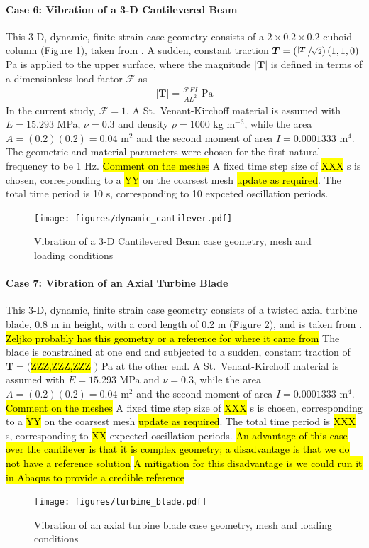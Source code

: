 \documentclass[sn-mathphys,Numbered,draft]{sn-jnl}%
\newcommand{\bb}{\boldsymbol}
\begin{document}
\paragraph{Case 6: Vibration of a 3-D Cantilevered Beam}
This 3-D, dynamic, finite strain case geometry consists of a $2 \times 0.2 \times 0.2$ cuboid column (Figure \ref{fig:dynamic_cantilever}), taken from \citet{Tukovic2007}.
A sudden, constant traction $\bb{T} = \left(\sfrac{|\bb{T}|}{\sqrt{2}}\right) \left(1, 1, 0 \right)$ Pa is applied to the upper surface, where the magnitude $|\bb{T}|$ is defined in terms of a dimensionless load factor $\mathcal{F}$ as
\begin{eqnarray}
	|\bb{T}| = \frac{\mathcal{F} E I}{A L^2} \text{ Pa}
\end{eqnarray}
In the current study, $\mathcal{F} = 1$.
A St.\ Venant-Kirchoff material is assumed with $E = 15.293$ MPa, $\nu = 0.3$ and density $\rho = 1000$ kg m$^{-3}$, while the area $A = (0.2)(0.2) = 0.04$ m$^2$ and the second moment of area $I = 0.0001333$ m$^4$.
The geometric and material parameters were chosen for the first natural frequency to be 1 Hz.
\hl{Comment on the meshes}
A fixed time step size of \hl{XXX} s is chosen, corresponding to a \hl{YY} on the coarsest mesh \hl{update as required}.
The total time period is 10 s, corresponding to 10 expceted oscillation periods.
\begin{figure}[htbp]
   \centering
   \texttt{[image: figures/dynamic\_cantilever.pdf]} 
   \caption{Vibration of a 3-D Cantilevered Beam case geometry, mesh and loading conditions}
   \label{fig:dynamic_cantilever}
\end{figure}


\paragraph{Case 7: Vibration of an Axial Turbine Blade}
This 3-D, dynamic, finite strain case geometry consists of a twisted axial turbine blade, 0.8 m in height, with a cord length of 0.2 m (Figure \ref{fig:turbine_blade}), and is taken from \citet{Tukovic2007}.
\hl{Zeljko probably has this geometry or a reference for where it came from}
The blade is constrained at one end and subjected to a sudden, constant traction of $\bb{T} = ($\hl{ZZZ,ZZZ,ZZZ} $)$ Pa at the other end.
A St.\ Venant-Kirchoff material is assumed with $E = 15.293$ MPa and $\nu = 0.3$, while the area $A = (0.2)(0.2) = 0.04$ m$^2$ and the second moment of area $I = 0.0001333$ m$^4$.
\hl{Comment on the meshes}
A fixed time step size of \hl{XXX} s is chosen, corresponding to a \hl{YY} on the coarsest mesh \hl{update as required}.
The total time period is \hl{XXX} s, corresponding to \hl{XX} expceted oscillation periods.
\hl{An advantage of this case over the cantilever is that it is complex geometry; a disadvantage is that we do not have a reference solution}
\hl{A mitigation for this disadvantage is we could run it in Abaqus to provide a credible reference}
\begin{figure}[htbp]
   \centering
   \texttt{[image: figures/turbine\_blade.pdf]} 
   \caption{Vibration of an axial turbine blade case geometry, mesh and loading conditions}
   \label{fig:turbine_blade}
\end{figure}
\end{document}
